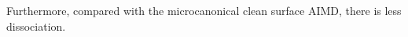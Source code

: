\documentclass[11pt,DIV=13,BCOR=5mm,a4paper,headinclude]{scrbook}
\begin{document}
Furthermore, compared with the microcanonical clean surface AIMD, there is less dissociation.

% 
% 
% 
% 
% 
\end{document}
